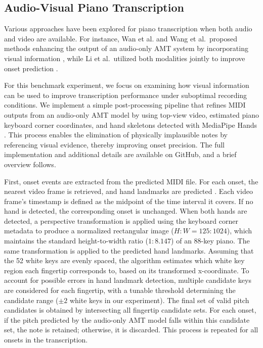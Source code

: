 \documentclass{article}
\begin{document}
\subsection{Audio-Visual Piano Transcription}

Various approaches have been explored for piano transcription when both audio and video are available. For instance, Wan et al. and Wang et al.\ proposed methods  enhancing the output of an audio-only AMT system by incorporating visual information \cite{CJE15Wan, DAFx21Wang}, while Li et al.\ utilized both modalities jointly to improve onset prediction \cite{ICASSPW23Li, TASLP24Li}. 

For this benchmark experiment, we focus on examining how visual information can be used to improve transcription performance under suboptimal recording conditions. We implement a simple post-processing pipeline that refines MIDI outputs from an audio-only AMT model by using top-view video, estimated piano keyboard corner coordinates, and hand skeletons detected with MediaPipe Hands \cite{arXiv20Zhang}. This process enables the elimination of physically implausible notes by referencing visual evidence, thereby improving onset precision. The full implementation and additional details are available on GitHub, and a brief overview follows.

First, onset events are extracted from the predicted MIDI file. For each onset, the nearest video frame is retrieved, and hand landmarks are predicted \cite{arXiv20Zhang}. Each video frame's timestamp is defined as the midpoint of the time interval it covers. If no hand is detected, the corresponding onset is unchanged. When both hands are detected, a perspective transformation is applied using the keyboard corner metadata to produce a normalized rectangular image ($H:W=125:1024$), which maintains the standard height-to-width ratio ($1:8.147$) of an 88-key piano. The same transformation is applied to the predicted hand landmarks. Assuming that the 52 white keys are evenly spaced, the algorithm estimates which white key region each fingertip corresponds to, based on its transformed x-coordinate. To account for possible errors in hand landmark detection, multiple candidate keys are considered for each fingertip, with a tunable threshold determining the candidate range ($\pm2$ white keys in our experiment). The final set of valid pitch candidates is obtained by intersecting all fingertip candidate sets. For each onset, if the pitch predicted by the audio-only AMT model falls within this candidate set, the note is retained; otherwise, it is discarded. This process is repeated for all onsets in the transcription.
\end{document}
